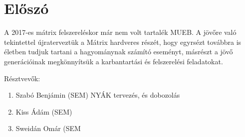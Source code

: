 \chapter*{Előszó}

A 2017-es mátrix felszereléskor már nem volt tartalék MUEB. A jövőre való tekintettel újraterveztük a Mátrix hardveres részét, hogy egyrsézt továbbra is életben tudjuk tartani a hagyománynak számító eseményt, másrészt a jövő generációinak megkönnyítsük a karbantartási és felszerelési feladatokat.

\par
Résztvevők:
\begin{enumerate} %
 \item Szabó Benjámin (SEM)  NYÁK tervezés, és dobozolás
 \item Kiss Ádám (SEM)
 \item Sweidán Omár (SEM
\end{enumerate}
